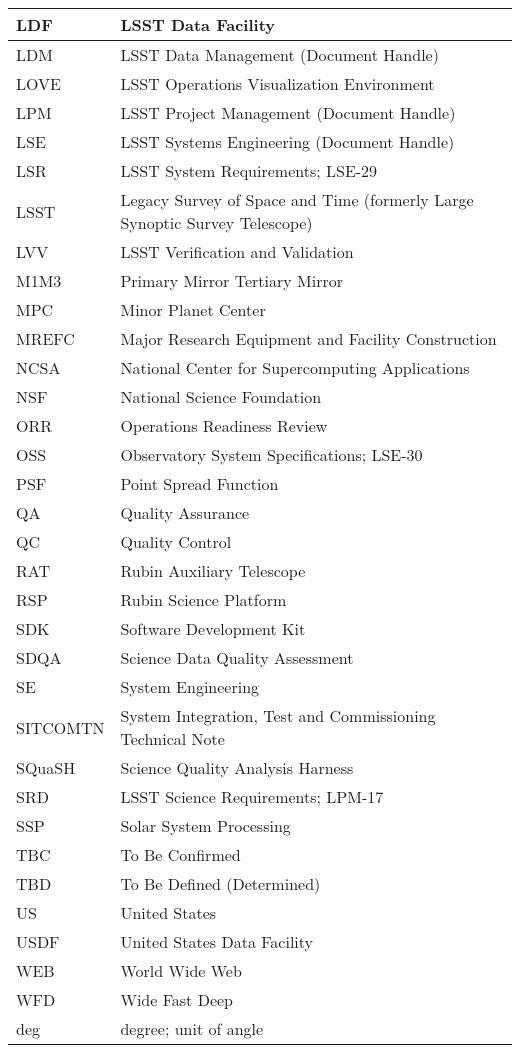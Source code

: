 \begin{longtable}{p{}p{}}
LDF & LSST Data Facility \\\hline
LDM & LSST Data Management (Document Handle) \\\hline
LOVE & LSST Operations Visualization Environment \\\hline
LPM & LSST Project Management (Document Handle) \\\hline
LSE & LSST Systems Engineering (Document Handle) \\\hline
LSR & LSST System Requirements; LSE-29 \\\hline
LSST & Legacy Survey of Space and Time (formerly Large Synoptic Survey Telescope) \\\hline
LVV & LSST Verification and Validation \\\hline
M1M3 & Primary Mirror Tertiary Mirror \\\hline
MPC & Minor Planet Center \\\hline
MREFC & Major Research Equipment and Facility Construction \\\hline
NCSA & National Center for Supercomputing Applications \\\hline
NSF & National Science Foundation \\\hline
ORR & Operations Readiness Review \\\hline
OSS & Observatory System Specifications; LSE-30 \\\hline
PSF & Point Spread Function \\\hline
QA & Quality Assurance \\\hline
QC & Quality Control \\\hline
RAT & Rubin Auxiliary Telescope \\\hline
RSP & Rubin Science Platform \\\hline
SDK & Software Development Kit \\\hline
SDQA & Science Data Quality Assessment \\\hline
SE & System Engineering \\\hline
SITCOMTN & System Integration, Test and Commissioning Technical Note \\\hline
SQuaSH & Science Quality Analysis Harness \\\hline
SRD & LSST Science Requirements; LPM-17 \\\hline
SSP & Solar System Processing \\\hline
TBC & To Be Confirmed \\\hline
TBD & To Be Defined (Determined) \\\hline
US & United States \\\hline
USDF & United States Data Facility \\\hline
WEB & World Wide Web \\\hline
WFD & Wide Fast Deep \\\hline
deg & degree; unit of angle \\\hline
\end{longtable}
